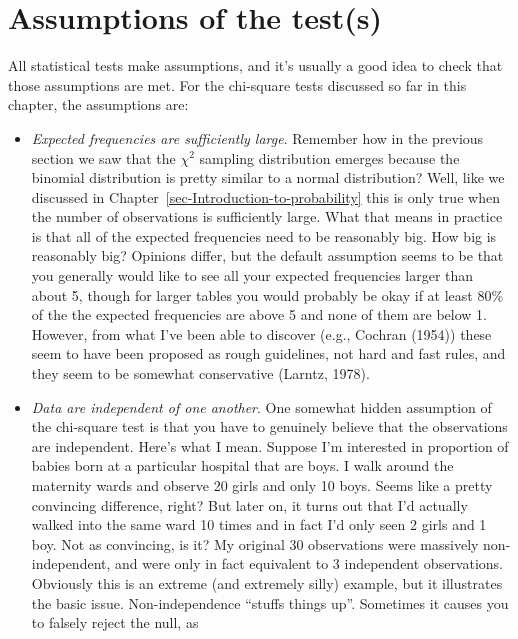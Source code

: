 \documentclass[
  a4paper,
]{book}
\providecommand{\tightlist}{%
  \setlength{\itemsep}{0pt}\setlength{\parskip}{0pt}}\usepackage{longtable,booktabs,array}
\begin{document}
\hypertarget{assumptions-of-the-tests}{%
\section{Assumptions of the test(s)}\label{assumptions-of-the-tests}}

All statistical tests make assumptions, and it's usually a good idea to
check that those assumptions are met. For the chi-square tests discussed
so far in this chapter, the assumptions are:

\begin{itemize}
\tightlist
\item
  \emph{Expected frequencies are sufficiently large}. Remember how in
  the previous section we saw that the \(\chi^2\) sampling distribution
  emerges because the binomial distribution is pretty similar to a
  normal distribution? Well, like we discussed in
  Chapter~\ref{sec-Introduction-to-probability} this is only true when
  the number of observations is sufficiently large. What that means in
  practice is that all of the expected frequencies need to be reasonably
  big. How big is reasonably big? Opinions differ, but the default
  assumption seems to be that you generally would like to see all your
  expected frequencies larger than about 5, though for larger tables you
  would probably be okay if at least 80\% of the the expected
  frequencies are above 5 and none of them are below 1. However, from
  what I've been able to discover (e.g., Cochran (1954)) these seem to
  have been proposed as rough guidelines, not hard and fast rules, and
  they seem to be somewhat conservative (Larntz, 1978).
\item
  \emph{Data are independent of one another}. One somewhat hidden
  assumption of the chi-square test is that you have to genuinely
  believe that the observations are independent. Here's what I mean.
  Suppose I'm interested in proportion of babies born at a particular
  hospital that are boys. I walk around the maternity wards and observe
  20 girls and only 10 boys. Seems like a pretty convincing difference,
  right? But later on, it turns out that I'd actually walked into the
  same ward 10 times and in fact I'd only seen 2 girls and 1 boy. Not as
  convincing, is it? My original 30 observations were massively
  non-independent, and were only in fact equivalent to 3 independent
  observations. Obviously this is an extreme (and extremely silly)
  example, but it illustrates the basic issue. Non-independence ``stuffs
  things up''. Sometimes it causes you to falsely reject the null, as

\end{itemize}
\end{document}
